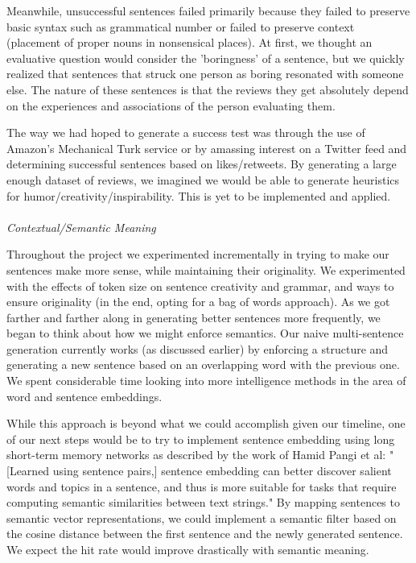 \documentclass[11pt]{article}
\begin{document}
Meanwhile, unsuccessful sentences failed primarily because they failed to preserve basic syntax such as grammatical number or failed to preserve context (placement of proper nouns in nonsensical places). At first, we thought an evaluative question would consider the 'boringness' of a sentence, but we quickly realized that sentences that struck one person as boring resonated with someone else. The nature of these sentences is that the reviews they get absolutely depend on the experiences and associations of the person evaluating them. 

The way we had hoped to generate a success test was through the use of Amazon's Mechanical Turk service or by amassing interest on a Twitter feed and determining successful sentences based on likes/retweets. By generating a large enough dataset of reviews, we imagined we would be able to generate heuristics for humor/creativity/inspirability. This is yet to be implemented and applied.
\\\\
\textit{Contextual/Semantic Meaning }

Throughout the project we experimented incrementally in trying to make our sentences make more sense, while maintaining their originality. We experimented with the effects of token size on sentence creativity and grammar, and ways to ensure originality (in the end, opting for a bag of words approach). As we got farther and farther along in generating better sentences more frequently, we began to think about how we might enforce semantics. Our naive multi-sentence generation currently works (as discussed earlier) by enforcing a structure and generating a new sentence based on an overlapping word with the previous one. We spent considerable time looking into more intelligence methods in the area of word and sentence embeddings.

While this approach is beyond what we could accomplish given our timeline, one of our next steps would be to try to implement sentence embedding using long short-term memory networks as described by the work of Hamid Pangi et al:
"[Learned using sentence pairs,] sentence embedding can better discover salient words and topics in a sentence, and thus is more suitable for tasks that require computing semantic similarities between text strings."\cite{palangi2015} By mapping sentences to semantic vector representations, we could implement a semantic filter based on the cosine distance between the first sentence and the newly generated sentence. We expect the hit rate would improve drastically with semantic meaning.
\end{document}
